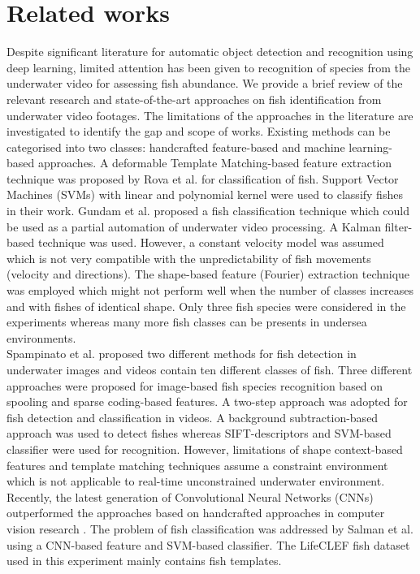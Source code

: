 \documentclass[conference]{IEEEtran}       %
\begin{document}
\section{Related works}
\label{rworks}
Despite significant literature for automatic object detection and recognition using deep learning, limited attention has been given to recognition of species from the underwater video for assessing fish abundance. We provide a brief review of the relevant research and state-of-the-art approaches on fish identification from underwater video footages. The limitations of the approaches in the literature are investigated to identify the gap and scope of works.  Existing methods can be categorised into two classes: handcrafted feature-based \cite{Rova07,Gundam2015,Spampinato2016} and machine learning-based \cite{Salman2016} approaches.
A deformable Template Matching-based feature extraction technique was proposed by Rova et al. \cite{Rova07} for classification of fish. Support Vector Machines (SVMs) with linear and polynomial kernel were used to classify fishes in their work.  Gundam et al. \cite{Gundam2015} proposed a fish classification technique which could be used as a partial automation of underwater video processing.  A Kalman filter-based technique was used. However, a constant velocity model was assumed which is not very compatible with the unpredictability of fish movements (velocity and directions). The shape-based feature (Fourier) extraction technique was employed which might not perform well when the number of classes increases and with fishes of identical shape.  Only three fish species were considered in the experiments whereas many more fish classes can be presents in undersea environments.\\
\indent Spampinato et al. \cite{Spampinato2016} proposed two different methods for fish detection in underwater images and videos contain ten different classes of fish. Three different approaches were proposed for image-based fish species recognition based on spooling and sparse coding-based features.  A two-step approach was adopted for fish detection and classification in videos.  A background subtraction-based approach was used to detect fishes whereas SIFT-descriptors and SVM-based classifier were used for recognition. However, limitations of shape context-based features and template matching techniques assume a constraint environment which is not applicable to real-time unconstrained underwater environment. Recently, the latest generation of Convolutional Neural Networks (CNNs) outperformed the approaches based on handcrafted approaches in computer vision research \cite{Chatfield14}. The problem of fish classification was addressed by Salman et al. \cite{Salman2016} using a CNN-based feature and SVM-based classifier.  The LifeCLEF fish dataset used in this experiment mainly contains fish templates.\\
\end{document}
